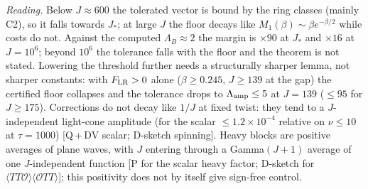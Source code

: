 \documentclass[aps,prl,onecolumn,superscriptaddress,nofootinbib]{revtex4-2}
\begin{document}
\emph{Reading.} Below $J\approx600$ the tolerated vector is bound by the ring classes (mainly C2), so it falls towards
$J_*$; at large $J$ the floor decays like $M_1(\beta)\sim\beta e^{-\beta/2}$ while costs do not. Against the computed
$\Lambda_B\approx2$ the margin is $\times90$ at $J_*$ and $\times16$ at $J=10^6$; beyond $10^6$ the tolerance falls with the
floor and the theorem is not stated. Lowering the threshold further needs a structurally sharper lemma, not sharper constants:
with $F_{\rm LR}>0$ alone ($\beta\ge0.245$, $J\ge139$ at the gap) the certified floor collapses and the tolerance drops to
$\Lambda_{\rm amp}\le5$ at $J=139$ ($\le95$ for $J\ge175$). Corrections do not decay like $1/J$ at fixed twist: they tend to a
$J$-independent light-cone amplitude (for the scalar $\le1.2\times10^{-4}$ relative on $\nu\le10$ at $\tau=1000$) [Q\,+\,DV scalar;
D-sketch spinning]. Heavy blocks are positive averages of plane waves, with $J$ entering through a Gamma$(J+1)$ average of one
$J$-independent function [P for the scalar heavy factor; D-sketch for $\langle TT\mathcal O\rangle\langle\mathcal OTT\rangle$]; this
positivity does not by itself give sign-free control.
\end{document}
